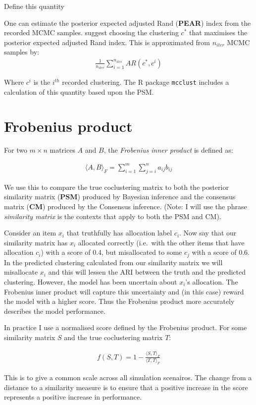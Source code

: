 \documentclass[
]{book}
\begin{document}
Define this quantity

One can estimate the posterior expected adjusted Rand (\textbf{PEAR}) index from the recorded MCMC samples. \citet{fritsch2009improved} suggest choosing the clustering \(c^*\) that maximises the posterior expected adjusted Rand index. This is approximated from \(n_{iter}\) MCMC samples by:
\begin{align}
    \frac{1}{n_{iter}}\sum_{i=1}^{n_{iter}} AR(c^*, c^i)
        \label{eq:PEAR}
    \end{align}

Where \(c^i\) is the \(i^{th}\) recorded clustering. The R package \texttt{mcclust} \citep{fritsch2009improved} includes a calculation of this quantity based upon the PSM.

\hypertarget{frobenius-product}{%
\section{Frobenius product}\label{frobenius-product}}

For two \(m \times n\) matrices \(A\) and \(B\), the \emph{Frobenius inner product} is defined as:

\begin{eqnarray}
\langle A, B \rangle _F = \sum_{i=1}^m \sum_{j=i}^n a_{ij}b_{ij}
\label{eq:frobeniusProduct}
\end{eqnarray}

We use this to compare the true coclustering matrix to both the posterior similarity matrix (\textbf{PSM}) produced by Bayesian inference and the consensus matrix (\textbf{CM}) produced by the Consensus inference. (Note: I will use the phrase \emph{similarity matrix} is the contexts that apply to both the PSM and CM).

Consider an item \(x_i\) that truthfully has allocation label \(c_i\). Now say that our similarity matrix has \(x_i\) allocated correctly (i.e.~with the other items that have allocation \(c_i\)) with a score of 0.4, but misallocated to some \(c_j\) with a score of 0.6. In the predicted clustering calculated from our similarity matrix we will misallocate \(x_i\) and this will lessen the ARI between the truth and the predicted clustering. However, the model has been uncertain about \(x_i\)'s allocation. The Frobenius inner product will capture this uncertainty and (in this case) reward the model with a higher score. Thus the Frobenius product more accurately describes the model performance.

In practice I use a normalised score defined by the Frobenius product. For some similarity matrix \(S\) and the true coclustering matrix \(T\):

\begin{eqnarray}
f(S, T) = 1 - \frac{\langle S, T \rangle _F}{\langle T, T \rangle _F}
\end{eqnarray}

This is to give a common scale across all simulation scenairos. The change from a distance to a similarity measure is to ensure that a positive increase in the score represents a positive increase in performance.

  
\end{document}
